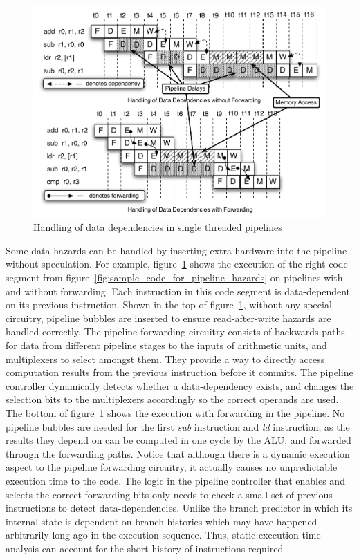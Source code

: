 \begin{figure}
\begin{center}
\includegraphics[scale=.6]{figs/data_depend_execution_non_interleaved}
\end{center}
\vspace{-10pt}
\caption{Handling of data dependencies in single threaded pipelines}
\label{fig:data_depend_execution_non_interleaved}
\end{figure}
Some data-hazards can be handled by inserting extra hardware into the pipeline without speculation.
For example, figure~\ref{fig:data_depend_execution_non_interleaved} shows the execution of the right code segment from figure~\ref{fig:sample_code_for_pipeline_hazards} on pipelines with and without forwarding.
Each instruction in this code segment is data-dependent on its previous instruction.   
Shown in the top of figure~\ref{fig:data_depend_execution_non_interleaved}, without any special circuitry, pipeline bubbles are inserted to ensure read-after-write hazards are handled correctly. 
The pipeline forwarding circuitry consists of backwards paths for data from different pipeline stages to the inputs of arithmetic units, and multiplexers to select amongst them. 
They provide a way to directly access computation results from the previous instruction before it commits. 
The pipeline controller dynamically detects whether a data-dependency exists, and changes the selection bits to the multiplexers accordingly so the correct operands are used.
The bottom of figure~\ref{fig:data_depend_execution_non_interleaved} shows the execution with forwarding in the pipeline.
No pipeline bubbles are needed for the first \emph{sub} instruction and \emph{ld} instruction, as the results they depend on can be computed in one cycle by the ALU, and forwarded through the forwarding paths.
Notice that although there is a dynamic execution aspect to the pipeline forwarding circuitry, it actually causes no unpredictable execution time to the code.
The logic in the pipeline controller that enables and selects the correct forwarding bits only needs to check a small set of previous instructions to detect data-dependencies. 
Unlike the branch predictor in which its internal state is dependent on branch histories which may have happened arbitrarily long ago in the execution sequence.
Thus, static execution time analysis can account for the short history of instructions required  

